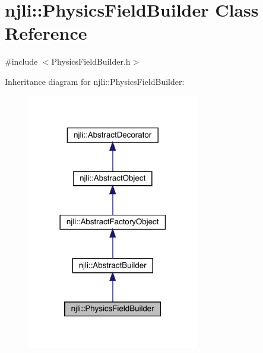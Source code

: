 \hypertarget{classnjli_1_1_physics_field_builder}{}\section{njli\+:\+:Physics\+Field\+Builder Class Reference}
\label{classnjli_1_1_physics_field_builder}


{\ttfamily \#include $<$Physics\+Field\+Builder.\+h$>$}



Inheritance diagram for njli\+:\+:Physics\+Field\+Builder\+:\nopagebreak
\begin{figure}[H]
\begin{center}
\leavevmode
\includegraphics[width=213pt]{classnjli_1_1_physics_field_builder__inherit__graph}
\end{center}
\end{figure}


